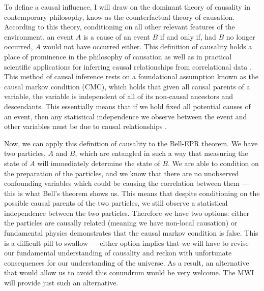 To define a causal influence, I will draw on the dominant theory of causality
in contemporary philosophy, know as the counterfactual theory of causation.
According to this theory, conditioning on all other relevant features of the
environment, an event $A$ is a cause of an event $B$ if and only if, had $B$ no
longer occurred, $A$ would not have occurred either. This definition of
causality holds a place of prominence in the philosophy of causation as well as
in practical scientific applications for inferring causal relationships from
correlational data \citep{Lewis_1973} \citep{Pearl_1995}. This method of causal
inference rests on a foundational assumption known as the causal markov
condition (CMC), which holds that given all causal parents of a variable, the
variable is independent of all of its non-causal ancestors and descendants. This
essentially means that if we hold fixed all potential causes of an event, then
any statistical independence we observe between the event and other variables
must be due to causal relationships \citep{Geiger_1990}. 

Now, we can apply this definition of causality to the Bell-EPR theorem. We
have two particles, $A$ and $B$, which are entangled in such a way that
measuring the state of $A$ will immediately determine the state of $B$. We are
able to condition on the preparation of the particles, and we know that there
are no unobserved confounding variables which could be causing the correlation
between them — this is what Bell's theorem shows us. This means that despite
conditioning on the possible causal parents of the two particles, we still
observe a statistical independence between the two particles. Therefore we have
two options: either the particles are causally related (meaning we have
non-local causation) or fundamental physics demonstrates that the causal markov
condition is false. This is a difficult pill to swallow — either option implies
that we will have to revise our fundamental understanding of causality and 
reckon with unfortunate consequences for our understanding of the universe. As a
result, an alternative that would allow us to avoid this conundrum would be
very welcome. The MWI will provide just such an alternative.
